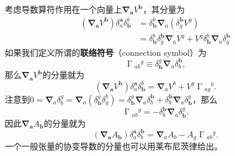 考虑导数算符作用在一个向量上$\boldsymbol{\nabla }_{\boldsymbol{a}} V^{\boldsymbol{b}}$，其分量为
\begin{equation*}
	\begin{aligned}
		(\boldsymbol{\nabla }_{\boldsymbol{a}} V^{\boldsymbol{b}} )\delta _{a}^{\boldsymbol{a}} \delta _{\boldsymbol{b}}^{b} & =\delta _{\boldsymbol{b}}^{b}\boldsymbol{\nabla }_{a} (\delta _{g}^{\boldsymbol{b}} V^{g} )\\
		& =\delta _{\boldsymbol{b}}^{b} \delta _{g}^{\boldsymbol{b}}\boldsymbol{\nabla }_{a} V^{g} +V^{g} \delta _{\boldsymbol{b}}^{b}\boldsymbol{\nabla }_{a} \delta _{g}^{\boldsymbol{b}}
	\end{aligned}
\end{equation*}
如果我们定义所谓的\textbf{联络符号}（connection symbol）为
\begin{equation*}
	\upGamma {_{ab}}^{g} \equiv \delta _{\boldsymbol{b}}^{g}\boldsymbol{\nabla }_{a} \delta _{b}^{\boldsymbol{b}} ,
\end{equation*}
那么$\boldsymbol{\nabla }_{\boldsymbol{a}} V^{\boldsymbol{b}}$的分量就为
\begin{equation}
	(\boldsymbol{\nabla }_{\boldsymbol{a}} V^{\boldsymbol{b}} )\delta _{a}^{\boldsymbol{a}} \delta _{\boldsymbol{b}}^{b} =\boldsymbol{\nabla }_{a} V^{b} +V^{g} \upGamma {_{ag}}^{b} .
	\label{eq:5.13}
\end{equation}
注意到$0=\boldsymbol{\nabla }_{a} \delta _{b}^{g} =\boldsymbol{\nabla }_{a} (\delta _{\boldsymbol{b}}^{g} \delta _{g}^{b} )=\delta _{\boldsymbol{b}}^{g}\boldsymbol{\nabla }_{a} \delta _{b}^{\boldsymbol{b}} +\delta _{b}^{\boldsymbol{b}}\boldsymbol{\nabla }_{a} \delta _{\boldsymbol{b}}^{g}$，那么
\begin{equation*}
	\upGamma {_{ab}}^{g} =-\delta _{b}^{\boldsymbol{b}}\boldsymbol{\nabla }_{a} \delta _{\boldsymbol{b}}^{g} .
\end{equation*}
因此$\boldsymbol{\nabla }_{\boldsymbol{a}} A_{\boldsymbol{b}}$的分量就为
\begin{equation*}
	(\boldsymbol{\nabla }_{\boldsymbol{a}} A_{\boldsymbol{b}}) \delta _{a}^{\boldsymbol{a}} \delta _{b}^{\boldsymbol{b}} =\boldsymbol{\nabla }_{a} A_{b} -A_{g} \upGamma {_{ab}}^{g} .
\end{equation*}
一个一般张量的协变导数的分量也可以用莱布尼茨律给出。

